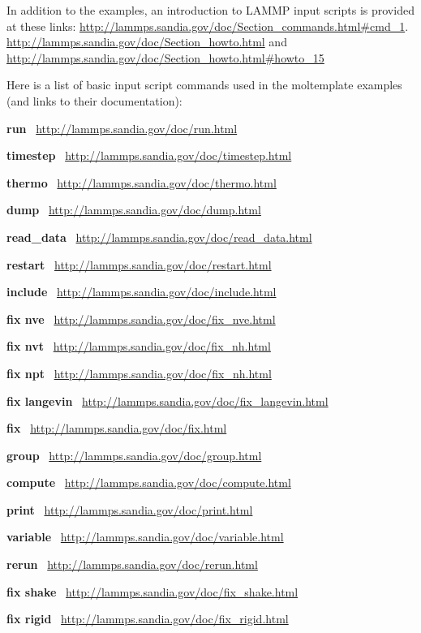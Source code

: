 \documentclass[11pt]{article}
\begin{document}
   In addition to the examples, an introduction to LAMMP 
input scripts is provided at these links:
\url{http://lammps.sandia.gov/doc/Section_commands.html#cmd_1}.
\url{http://lammps.sandia.gov/doc/Section_howto.html} and 
\url{http://lammps.sandia.gov/doc/Section_howto.html#howto_15}


Here is a list of basic input script commands 
used in the moltemplate examples
(and links to their documentation):
\begin{list}{}
\item \textbf{run} \ 
\url{http://lammps.sandia.gov/doc/run.html}
\item \textbf{timestep} \ 
\url{http://lammps.sandia.gov/doc/timestep.html}
\item \textbf{thermo} \ \url{http://lammps.sandia.gov/doc/thermo.html}
\item \textbf{dump} \ \url{http://lammps.sandia.gov/doc/dump.html}
\item \textbf{read\_data} \ \url{http://lammps.sandia.gov/doc/read_data.html}
\item \textbf{restart} \ \url{http://lammps.sandia.gov/doc/restart.html}
\item \textbf{include} \ \url{http://lammps.sandia.gov/doc/include.html}
\item \textbf{fix nve} \ \url{http://lammps.sandia.gov/doc/fix_nve.html}
\item \textbf{fix nvt} \ \url{http://lammps.sandia.gov/doc/fix_nh.html}
\item \textbf{fix npt} \ \url{http://lammps.sandia.gov/doc/fix_nh.html}
\item \textbf{fix langevin} \ \url{http://lammps.sandia.gov/doc/fix_langevin.html}
\item \textbf{fix} \ \url{http://lammps.sandia.gov/doc/fix.html}
\item \textbf{group} \ \url{http://lammps.sandia.gov/doc/group.html}
\item \textbf{compute} \ \url{http://lammps.sandia.gov/doc/compute.html}
\item \textbf{print} \ \url{http://lammps.sandia.gov/doc/print.html}
\item \textbf{variable} \ \url{http://lammps.sandia.gov/doc/variable.html}
\item \textbf{rerun} \ \url{http://lammps.sandia.gov/doc/rerun.html}
\item \textbf{fix shake} \ \url{http://lammps.sandia.gov/doc/fix_shake.html}
\item \textbf{fix rigid} \ \url{http://lammps.sandia.gov/doc/fix_rigid.html}
\end{list}
\end{document}
